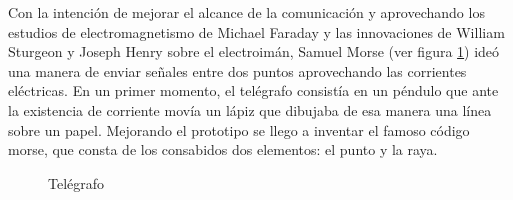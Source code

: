 Con la intención de mejorar el alcance de la comunicación y aprovechando los estudios de electromagnetismo de Michael Faraday y las innovaciones de William Sturgeon y Joseph Henry sobre el electroimán, Samuel Morse (ver figura \ref{fig:telegrafo}) ideó una manera de enviar señales entre dos puntos aprovechando las corrientes eléctricas. En un primer momento, el telégrafo consistía en un péndulo que ante la existencia de corriente movía un lápiz que dibujaba de esa manera una línea sobre un papel. Mejorando el prototipo se llego a inventar el famoso código morse, que consta de los consabidos dos elementos: el punto y la raya.

\begin{figure}[h!btp]
	\begin{adjustbox}{minipage=\linewidth, fbox}
		\centering
		\hspace{10mm}
	\end{adjustbox}
\caption{Telégrafo}
	\label{fig:telegrafo}
\end{figure}

